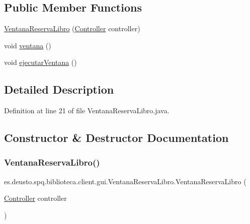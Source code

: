 \subsection*{Public Member Functions}
\begin{DoxyCompactItemize}
\item 
\mbox{\hyperlink{classes_1_1deusto_1_1spq_1_1biblioteca_1_1client_1_1gui_1_1_ventana_reserva_libro_a99e179051bda7281c34b0a4eaddbe78d}{Ventana\+Reserva\+Libro}} (\mbox{\hyperlink{classes_1_1deusto_1_1spq_1_1biblioteca_1_1controller_1_1_controller}{Controller}} controller)
\item 
void \mbox{\hyperlink{classes_1_1deusto_1_1spq_1_1biblioteca_1_1client_1_1gui_1_1_ventana_reserva_libro_a91e2a0b1beb4353db52c2b3b8d8a8d1a}{ventana}} ()
\item 
void \mbox{\hyperlink{classes_1_1deusto_1_1spq_1_1biblioteca_1_1client_1_1gui_1_1_ventana_reserva_libro_aed223a49195d685d15baf23d7bdd8469}{ejecutar\+Ventana}} ()
\end{DoxyCompactItemize}


\subsection{Detailed Description}


Definition at line 21 of file Ventana\+Reserva\+Libro.\+java.



\subsection{Constructor \& Destructor Documentation}
\mbox{\label{classes_1_1deusto_1_1spq_1_1biblioteca_1_1client_1_1gui_1_1_ventana_reserva_libro_a99e179051bda7281c34b0a4eaddbe78d}} 
\subsubsection{\texorpdfstring{Ventana\+Reserva\+Libro()}{VentanaReservaLibro()}}
{\footnotesize\ttfamily es.\+deusto.\+spq.\+biblioteca.\+client.\+gui.\+Ventana\+Reserva\+Libro.\+Ventana\+Reserva\+Libro (\begin{DoxyParamCaption}\item[{\mbox{\hyperlink{classes_1_1deusto_1_1spq_1_1biblioteca_1_1controller_1_1_controller}{Controller}}}]{controller }\end{DoxyParamCaption})}

